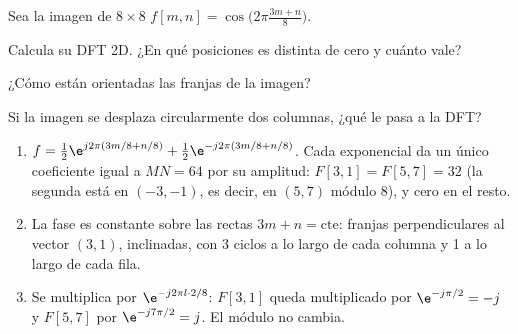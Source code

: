 \documentclass[11pt,a4paper]{scrartcl}
\begin{document}
\begin{ejercicio}
  Sea la imagen de $8\times8$ $f[m,n]=\cos\!\big(2\pi\frac{3m+n}8\big)$.
  \begin{incisos}[1]
    \item Calcula su DFT 2D. ¿En qué posiciones es distinta de cero y cuánto vale?
    \item ¿Cómo están orientadas las franjas de la imagen?
    \item Si la imagen se desplaza circularmente dos columnas, ¿qué le pasa a la DFT?
  \end{incisos}
\end{ejercicio}
\begin{solucion}
  \begin{enumerate}[label=\alph*)]
    \item $f=\frac12\e^{j2\pi(3m/8+n/8)}+\frac12\e^{-j2\pi(3m/8+n/8)}$. Cada exponencial da un único coeficiente igual a $MN=64$ por su amplitud: $F[3,1]=F[5,7]=32$ (la segunda está en $(-3,-1)$, es decir, en $(5,7)$ módulo 8), y cero en el resto.
    \item La fase es constante sobre las rectas $3m+n=\text{cte}$: franjas perpendiculares al vector $(3,1)$, inclinadas, con 3 ciclos a lo largo de cada columna y 1 a lo largo de cada fila.
    \item Se multiplica por $\e^{-j2\pi l\cdot2/8}$: $F[3,1]$ queda multiplicado por $\e^{-j\pi/2}=-j$ y $F[5,7]$ por $\e^{-j7\pi/2}=j$. El módulo no cambia.
  \end{enumerate}
\end{solucion}
\end{document}
